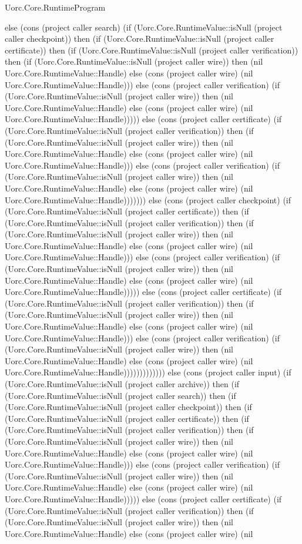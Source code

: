 \begin{lexlean}{Uorc.Core.RuntimeProgram}
\begin{semanticmodule}
{else (cons (project caller search) (if (Uorc.Core.RuntimeValue::isNull (project caller checkpoint)) then (if (Uorc.Core.RuntimeValue::isNull (project caller certificate)) then (if (Uorc.Core.RuntimeValue::isNull (project caller verification)) then (if (Uorc.Core.RuntimeValue::isNull (project caller wire)) then (nil Uorc.Core.RuntimeValue::Handle) else (cons (project caller wire) (nil Uorc.Core.RuntimeValue::Handle))) else (cons (project caller verification) (if (Uorc.Core.RuntimeValue::isNull (project caller wire)) then (nil Uorc.Core.RuntimeValue::Handle) else (cons (project caller wire) (nil Uorc.Core.RuntimeValue::Handle))))) else (cons (project caller certificate) (if (Uorc.Core.RuntimeValue::isNull (project caller verification)) then (if (Uorc.Core.RuntimeValue::isNull (project caller wire)) then (nil Uorc.Core.RuntimeValue::Handle) else (cons (project caller wire) (nil Uorc.Core.RuntimeValue::Handle))) else (cons (project caller verification) (if (Uorc.Core.RuntimeValue::isNull (project caller wire)) then (nil Uorc.Core.RuntimeValue::Handle) else (cons (project caller wire) (nil Uorc.Core.RuntimeValue::Handle))))))) else (cons (project caller checkpoint) (if (Uorc.Core.RuntimeValue::isNull (project caller certificate)) then (if (Uorc.Core.RuntimeValue::isNull (project caller verification)) then (if (Uorc.Core.RuntimeValue::isNull (project caller wire)) then (nil Uorc.Core.RuntimeValue::Handle) else (cons (project caller wire) (nil Uorc.Core.RuntimeValue::Handle))) else (cons (project caller verification) (if (Uorc.Core.RuntimeValue::isNull (project caller wire)) then (nil Uorc.Core.RuntimeValue::Handle) else (cons (project caller wire) (nil Uorc.Core.RuntimeValue::Handle))))) else (cons (project caller certificate) (if (Uorc.Core.RuntimeValue::isNull (project caller verification)) then (if (Uorc.Core.RuntimeValue::isNull (project caller wire)) then (nil Uorc.Core.RuntimeValue::Handle) else (cons (project caller wire) (nil Uorc.Core.RuntimeValue::Handle))) else (cons (project caller verification) (if (Uorc.Core.RuntimeValue::isNull (project caller wire)) then (nil Uorc.Core.RuntimeValue::Handle) else (cons (project caller wire) (nil Uorc.Core.RuntimeValue::Handle))))))))))))) else (cons (project caller input) (if (Uorc.Core.RuntimeValue::isNull (project caller archive)) then (if (Uorc.Core.RuntimeValue::isNull (project caller search)) then (if (Uorc.Core.RuntimeValue::isNull (project caller checkpoint)) then (if (Uorc.Core.RuntimeValue::isNull (project caller certificate)) then (if (Uorc.Core.RuntimeValue::isNull (project caller verification)) then (if (Uorc.Core.RuntimeValue::isNull (project caller wire)) then (nil Uorc.Core.RuntimeValue::Handle) else (cons (project caller wire) (nil Uorc.Core.RuntimeValue::Handle))) else (cons (project caller verification) (if (Uorc.Core.RuntimeValue::isNull (project caller wire)) then (nil Uorc.Core.RuntimeValue::Handle) else (cons (project caller wire) (nil Uorc.Core.RuntimeValue::Handle))))) else (cons (project caller certificate) (if (Uorc.Core.RuntimeValue::isNull (project caller verification)) then (if (Uorc.Core.RuntimeValue::isNull (project caller wire)) then (nil Uorc.Core.RuntimeValue::Handle) else (cons (project caller wire) (nil }
\end{semanticmodule}
\end{lexlean}
